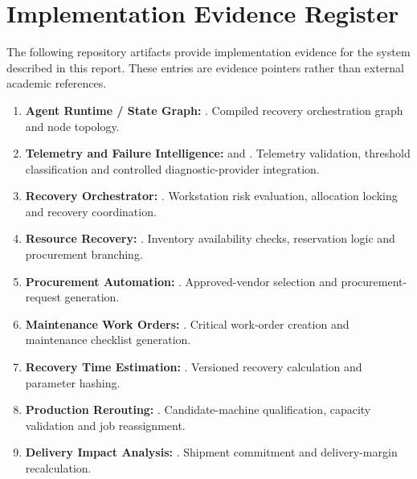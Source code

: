 \documentclass[10pt,twocolumn,a4paper]{article}
\begin{document}
\section*{Implementation Evidence Register}
\noindent
The following repository artifacts provide implementation evidence for the
system described in this report. These entries are evidence pointers rather
than external academic references.
\begin{enumerate}[label={E\arabic*},leftmargin=*,itemsep=2pt]
\footnotesize
\item \textbf{Agent Runtime / State Graph:} . Compiled recovery orchestration graph and node topology.
\item \textbf{Telemetry and Failure Intelligence:}  and . Telemetry validation, threshold classification and controlled diagnostic-provider integration.
\item \textbf{Recovery Orchestrator:} . Workstation risk evaluation, allocation locking and recovery coordination.
\item \textbf{Resource Recovery:} . Inventory availability checks, reservation logic and procurement branching.
\item \textbf{Procurement Automation:} . Approved-vendor selection and procurement-request generation.
\item \textbf{Maintenance Work Orders:} . Critical work-order creation and maintenance checklist generation.
\item \textbf{Recovery Time Estimation:} . Versioned recovery calculation and parameter hashing.
\item \textbf{Production Rerouting:} . Candidate-machine qualification, capacity validation and job reassignment.
\item \textbf{Delivery Impact Analysis:} . Shipment commitment and delivery-margin recalculation.

\end{enumerate}
\end{document}
